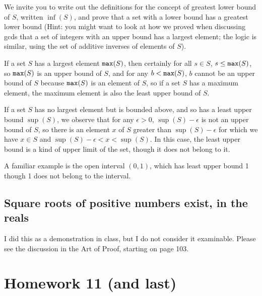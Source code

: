 \documentclass[12pt]{article}
\begin{document}
We invite you to write out the definitions for the concept of greatest lower bound of $S$, written $\inf(S)$, and prove that
a set with a lower bound has a greatest lower bound (Hint:  you might want to look at how we proved when discussing gcds that a set of integers with an upper bound has a largest element;  the logic is similar, using the set of additive inverses of elements of $S$).

If a set $S$ has a largest element ${\tt max}(S)$, then certainly for all $s \in S$, $s \leq {\tt max}(S)$, so ${\tt max}(S)$ is an upper bound of $S$, and for any $b < {\tt max}(S)$, $b$ cannot be an upper bound of $S$ because ${\tt max}(S)$ is an element of $S$, so if a set $S$ has a maximum element, the maximum element is also the least upper bound of $S$.

If a set $S$ has no largest element but is bounded above, and so has a least upper bound $\sup(S)$, we observe that for any $\epsilon>0$, $\sup(S)-\epsilon$ is not an upper bound of $S$, so there is an element $x$ of $S$ greater than $\sup(S)-\epsilon$ for which we have $x \in S$ and $\sup(S)-\epsilon<x<\sup(S)$.  In this case, the least upper bound is a kind of upper limit of the set, though it does not belong to it.

A familiar example is the open interval $(0,1)$, which has least upper bound 1 though 1 does not belong to the interval.

\subsection{Square roots of positive numbers exist, in the reals}

I did this as a demonstration in class, but I do not consider it examinable.  Please see the discussion in the Art of Proof, starting on page 103.

\newpage

\section{Homework 11 (and last)}
\end{document}
